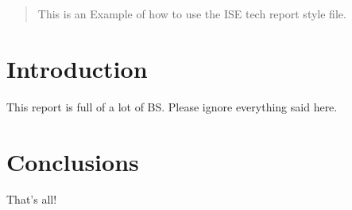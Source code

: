 \documentclass[11pt]{article}
\begin{document}
\begin{abstract}
This is an Example of how to use the ISE tech report style file.

\end{abstract}


\section{Introduction}
\label{sec:intro}

This report is full of a lot of BS. Please ignore everything said here.

\section{Conclusions}
\label{sec:conclusions}

That's all!
\end{document}
